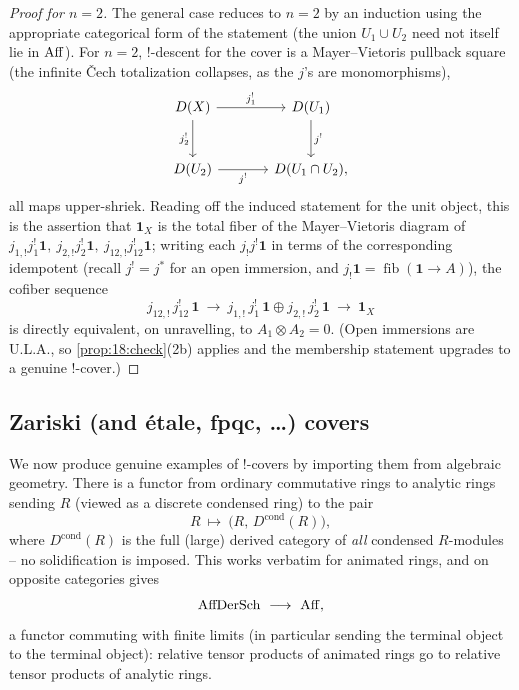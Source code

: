 \begin{proof}[Proof for $n=2$]
The general case reduces to $n=2$ by an induction using the appropriate
categorical form of the statement (the union $U_1\cup U_2$ need not itself lie in
$\operatorname{Aff}$). For $n=2$, $!$-descent for the cover is a Mayer--Vietoris pullback square
(the infinite \v Cech totalization collapses, as the $j$'s are monomorphisms),
\begin{equation*}
\begin{tikzcd}[column sep=large, row sep=large]
D(X) \arrow[r, "j_1^!"] \arrow[d, "j_2^!"'] & D(U_1) \arrow[d, "j^!"] \\
D(U_2) \arrow[r, "j^!"'] & D(U_1\cap U_2),
\end{tikzcd}
\end{equation*}
all maps upper-shriek. Reading off the induced statement for the unit object, this
is the assertion that $\mathbf 1_X$ is the total fiber of the Mayer--Vietoris
diagram of $j_{1,!}j_1^!\mathbf 1,\ j_{2,!}j_2^!\mathbf 1,\ j_{12,!}j_{12}^!\mathbf
1$; writing each $j_!j^!\mathbf 1$ in terms of the corresponding idempotent (recall
$j^!=j^*$ for an open immersion, and $j_!\mathbf 1=\operatorname{fib}(\mathbf 1\to
A)$), the cofiber sequence
\begin{equation*}
j_{12,!}\,j_{12}^!\,\mathbf 1\ \longrightarrow\ j_{1,!}\,j_1^!\,\mathbf 1\oplus j_{2,!}\,j_2^!\,\mathbf 1\ \longrightarrow\ \mathbf 1_X
\end{equation*}
is directly equivalent, on unravelling, to $A_1\otimes A_2=0$. (Open immersions are
U.L.A., so \cref{prop:18:check}(2b) applies and the membership statement upgrades to
a genuine $!$-cover.)
\end{proof}

\subsection{Zariski (and \'etale, fpqc, \dots) covers}
\label{subsec:18:zariski}

We now produce genuine examples of $!$-covers by importing them from algebraic
geometry. There is a functor from ordinary commutative rings to analytic rings
sending $R$ (viewed as a discrete condensed ring) to the pair
\begin{equation*}
R\ \longmapsto\ \bigl(R,\,D^{\mathrm{cond}}(R)\bigr),
\end{equation*}
where $D^{\mathrm{cond}}(R)$ is the full (large) derived category of \emph{all}
condensed $R$-modules -- no solidification is imposed. This works verbatim for
animated rings, and on opposite categories gives
\begin{equation}
\label{eq:18:affsch-to-aff}
\mathrm{AffDerSch}\ \longrightarrow\ \operatorname{Aff},
\end{equation}
a functor commuting with finite limits (in particular sending the terminal object
to the terminal object): relative tensor products of animated rings go to relative
tensor products of analytic rings.

